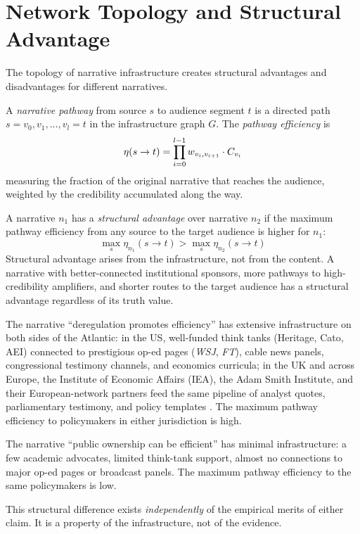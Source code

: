 \section{Network Topology and Structural Advantage}
\label{sec:ch7-topology}

The topology of narrative infrastructure creates structural advantages and disadvantages for different narratives.

\begin{definition}
\label{def:pathway}
A \emph{narrative pathway} from source $s$ to audience segment $t$ is a directed path $s = v_0, v_1, \ldots, v_l = t$ in the infrastructure graph $G$.
The \emph{pathway efficiency} is
\[
  \eta(s \to t) = \prod_{i=0}^{l-1} w_{v_i, v_{i+1}} \cdot C_{v_i}
\]
measuring the fraction of the original narrative that reaches the audience, weighted by the credibility accumulated along the way.
\end{definition}

\begin{proposition}
\label{prop:structural-advantage}
A narrative $n_1$ has a \emph{structural advantage} over narrative $n_2$ if the maximum pathway efficiency from any source to the target audience is higher for $n_1$:
\[
  \max_{s} \eta_{n_1}(s \to t) > \max_{s} \eta_{n_2}(s \to t)
\]
Structural advantage arises from the infrastructure, not from the content.
A narrative with better-connected institutional sponsors, more pathways to high-credibility amplifiers, and shorter routes to the target audience has a structural advantage regardless of its truth value.
\end{proposition}

\begin{example}
\label{ex:structural-advantage}
The narrative ``deregulation promotes efficiency'' has extensive infrastructure on both sides of the Atlantic: in the US, well-funded think tanks (Heritage, Cato, AEI) connected to prestigious op-ed pages (\textit{WSJ}, \textit{FT}), cable news panels, congressional testimony channels, and economics curricula; in the UK and across Europe, the Institute of Economic Affairs (IEA), the Adam Smith Institute, and their European-network partners feed the same pipeline of analyst quotes, parliamentary testimony, and policy templates \autocite{cockett1994, plehwe2006}.
The maximum pathway efficiency to policymakers in either jurisdiction is high.

The narrative ``public ownership can be efficient'' has minimal infrastructure: a few academic advocates, limited think-tank support, almost no connections to major op-ed pages or broadcast panels.
The maximum pathway efficiency to the same policymakers is low.

This structural difference exists \emph{independently} of the empirical merits of either claim.
It is a property of the infrastructure, not of the evidence.
\end{example}


